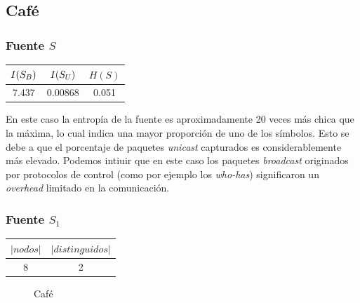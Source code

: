 
\subsection{\textbf{Café}}

\subsubsection{Fuente $S$}

\begin{center}\small
	\begin{tabular}{ c | c | c }
	  $I(S_{B})$ & $I(S_{U})$ & $H(S)$ \\
	  \hline
	  7.437 & 0.00868 & 0.051 \\
	\end{tabular}
\end{center}

En este caso la entropía de la fuente es aproximadamente 20 veces más chica que la máxima, lo cual indica una mayor proporción de uno de los símbolos. Esto se debe a que el porcentaje de paquetes \textit{unicast} capturados es considerablemente más elevado. Podemos intiuir que en este caso los paquetes \textit{broadcast} originados por protocolos de control (como por ejemplo los \textit{who-has}) significaron un \textit{overhead} limitado en la comunicación.

\medskip

\subsubsection{Fuente $S_1$}

\begin{center}\small
	\begin{tabular}{ c | c }
	  $|nodos|$ & $|distinguidos|$ \\
	  \hline
	  8 & 2 \\
	\end{tabular}
\end{center}

\begin{figure}[H]
	\centering
	\caption{Café}
	
	\label{grafo_cafe}
\end{figure}

